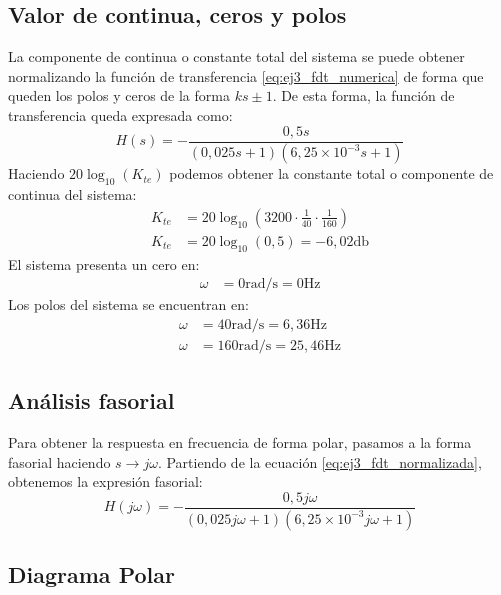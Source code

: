 \subsection{Valor de continua, ceros y polos}

La componente de continua o constante total del sistema se puede obtener normalizando la función de transferencia \ref{eq:ej3_fdt_numerica} de
forma que queden los polos y ceros de la forma $ks \pm 1$. De esta forma, la función de transferencia queda expresada como:
\begin{equation}
    H(s) = -\frac{0,5 s}{\left(0,025 s + 1\right) \left(6,25 \times 10^{-3} s + 1\right)}
    \label{eq:ej3_fdt_normalizada}
\end{equation}
Haciendo $20\log_{10}\left(K_{te}\right)$ podemos obtener la constante total o componente de continua del sistema:
\begin{align*}
    K_{te} &= 20 \log_{10}\left(3200 \cdot \frac{1}{40} \cdot \frac{1}{160}\right) \\[6pt]
    K_{te} &= 20 \log_{10}(0,5) = -6,02 \si{\decibel}
\end{align*}
El sistema presenta un cero en:
\begin{align*}
    \omega &= 0 \si{\radian\per\second} = 0 \si{\hertz}
\end{align*}
Los polos del sistema se encuentran en:
\begin{align*}
    \omega &= 40 \si{\radian\per\second} = 6,36 \si{\hertz} \\[6pt]
    \omega &= 160 \si{\radian\per\second} = 25,46 \si{\hertz}
\end{align*}

\subsection{Análisis fasorial}

Para obtener la respuesta en frecuencia de forma polar, pasamos a la forma fasorial haciendo $s \to j\omega$. Partiendo de la ecuación \ref{eq:ej3_fdt_normalizada}, obtenemos la expresión fasorial:
\begin{equation}
    H(j\omega) = -\frac{0,5 j\omega}{\left(0,025 j\omega + 1\right) \left(6,25 \times 10^{-3} j\omega + 1\right)}
    \label{eq:ej3_fdt_fasorial}
\end{equation}

\subsection{Diagrama Polar}

